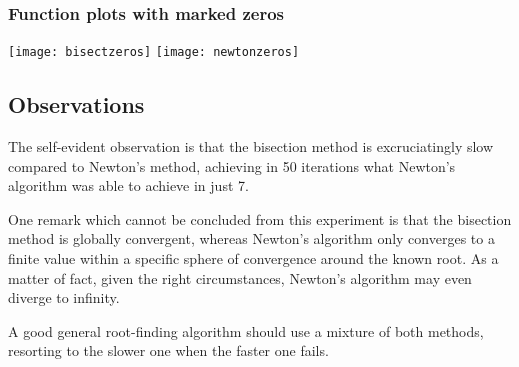 \documentclass{article}
\begin{document}
	\subsubsection{Function plots with marked zeros}
	
	\texttt{[image: bisectzeros]}
	\texttt{[image: newtonzeros]}
	
	\subsection{Observations}
	
	The self-evident observation is that the bisection method is excruciatingly
	slow compared to Newton's method, achieving in 50 iterations what Newton's
	algorithm was able to achieve in just 7.

	One remark which cannot be concluded from this experiment is that the
	bisection method is globally convergent, whereas Newton's algorithm only
	converges to a finite value within a specific sphere of convergence around
	the known root. As a matter of fact, given the right circumstances, Newton's
	algorithm may even diverge to infinity.
	
	A good general root-finding algorithm should use a mixture of both methods,
	resorting to the slower one when the faster one fails.
	
\end{document}
